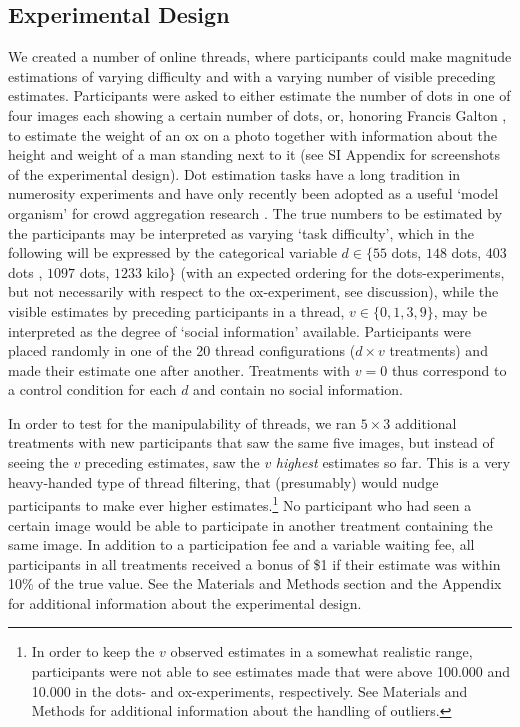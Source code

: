 \documentclass[9pt,twocolumn,twoside,lineno]{article}
\begin{document}

\subsection*{Experimental Design}
We created a number of online threads, where participants could make magnitude estimations of varying difficulty and with a varying number of visible preceding estimates. Participants were asked to either estimate the number of dots in one of four images each showing a certain number of dots, or, honoring Francis Galton \cite{galton1907vox}, to estimate the weight of an ox on a photo together with information about the height and weight of a man standing next to it (see SI Appendix for screenshots of the experimental design). Dot estimation tasks have a long tradition in numerosity experiments \cite{minturn1951effect, indow1977scaling, krueger1982single} and have only recently been adopted as a useful ‘model organism’ for crowd aggregation research \cite{horton2010dot, ugander2015wisdom}. The true numbers to be estimated by the participants may be interpreted as varying ‘task difficulty’, which in the following will be expressed by the categorical variable $d \in \{55$ dots, $148$ dots, $403$ dots , $1097$ dots, $1233$ kilo$\}$ (with an expected ordering for the dots-experiments, but not necessarily with respect to the ox-experiment, see discussion), while the visible estimates by preceding participants in a thread, $v \in \{0,1,3,9\}$, may be interpreted as the degree of ‘social information’ available. Participants were placed randomly in one of the 20 thread configurations ($d \times v$ treatments) and made their estimate one after another. Treatments with $v=0$ thus correspond to a control condition for each $d$ and contain no social information. 

In order to test for the manipulability of threads, we ran $5 \times 3$ additional treatments with new participants that saw the same five images, but instead of seeing the $v$ preceding estimates, saw the $v$ \textit{highest} estimates so far. This is a very heavy-handed type of thread filtering, that (presumably) would nudge participants to make ever higher estimates.\footnote{In order to keep the $v$ observed estimates in a somewhat realistic range, participants were not able to see estimates made that were above 100.000 and 10.000 in the  dots- and ox-experiments, respectively. See Materials and Methods for additional information about the handling of outliers.} No participant who had seen a certain image would be able to participate in another treatment containing the same image. In addition to a participation fee and a variable waiting fee, all participants in all treatments received a bonus of \$1 if their estimate was within 10\% of the true value. See the Materials and Methods section and the Appendix for additional information about the experimental design.
\end{document}
